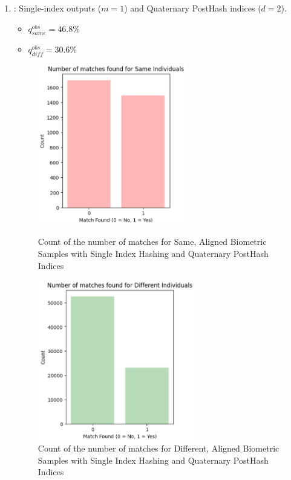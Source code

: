 \begin{enumerate}
    \item {}: Single-index outputs (\(m=1\)) and Quaternary PostHash indices (\(d=2\)).
    \begin{itemize}
        \item \(q_{same}^{obs} = 46.8\%\)
        \item \(q_{diff}^{obs} = 30.6\%\)
    \end{itemize}

    \begin{figure}[H]
        \centering
        \begin{minipage}[b]{0.48\linewidth}
            \centering
            \includegraphics[width=\linewidth,height=7cm,keepaspectratio]{latex-img/d2same.png}
            \caption{Count of the number of matches for Same, Aligned Biometric Samples with Single Index Hashing and Quaternary PostHash Indices}
            \label{mu_same}
        \end{minipage}
        \hfill
        \begin{minipage}[b]{0.48\linewidth}
            \centering
            \includegraphics[width=\linewidth,height=7cm,keepaspectratio]{latex-img/d2diff.png}
            \caption{Count of the number of matches for Different, Aligned Biometric Samples with Single Index Hashing and Quaternary PostHash Indices}
            \label{mu_diff}
        \end{minipage}
    \end{figure}
    

\end{enumerate}
